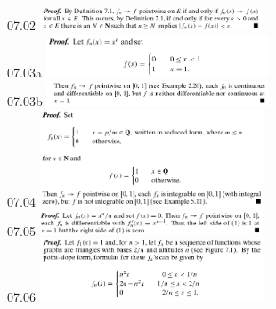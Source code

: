 \documentclass[3pt,landscape]{article}
\begin{document}
\raggedright{}
\begin{multicols}{3}
    07.02
    \includegraphics[width=250]{07_02.png} \\
    07.03a
    \includegraphics[width=250]{07_03a.png} \\
    07.03b
    \includegraphics[width=250]{07_03b.png} \\
    07.04
    \includegraphics[width=250]{07_04.png} \\
    07.05
    \includegraphics[width=250]{07_05.png} \\
    07.06
    \includegraphics[width=250]{07_06a.png} \\

\end{multicols}
\end{document}
